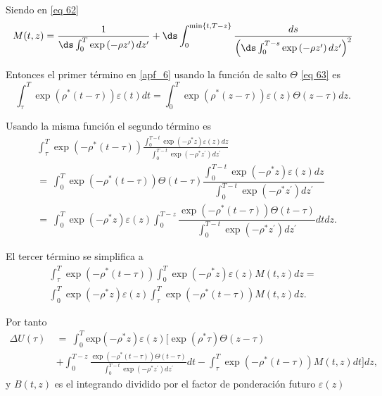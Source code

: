 Siendo en \ref{eq 62}
\begin{equation}
M(t, z)=\dfrac{1}{\ds \int_0^T \exp \left(-\rho z^{\prime}\right) d z^{\prime}}+\ds \int_0^{\min \{t, T-z\}} \dfrac{d s}{\left(\ds \int_0^{T-s} \exp \left(-\rho z^{\prime}\right) d z^{\prime}\right)^2}
\end{equation}

Entonces el primer término en \ref{apf_6} usando la función de salto $\Theta$ \ref{eq 63} es
$$\int_{\tau}^{T}\exp(\rho^{\ast}(t-\tau))\varepsilon(t)d t=\int_{0}^{T}\exp(\rho^{\ast}(z-\tau))\varepsilon(z)\Theta(z-\tau)dz.$$

Usando la misma función el segundo término es
\begin{equation*}
    \begin{split}
        &\int_{\tau}^{T}\exp(-\rho^{\ast}(t-\tau)){\frac{\int_{0}^{T-t}\exp(-\rho^{\ast}z)\varepsilon(z)d z}{\int_{0}^{T-t}\exp(-\rho^{\ast}z^{\prime})d z^{\prime}}}\\
        &=~\int_{0}^{T}\exp(-\rho^{\ast}(t-\tau))\Theta(t-\tau){\dfrac{\int_{0}^{T-t}\exp(-\rho^{\ast}z)\varepsilon(z) dz}{\int_{0}^{T-t}\exp(-\rho^{\ast}z^{\prime})d z^{\prime}}} \\
        &=~\int_{0}^{T}\exp(-\rho^{\ast}z)\varepsilon(z)\int_0^{T-z}{\dfrac{\exp(-\rho^{\ast}(t- \tau))\Theta(t- \tau)}{\int_{0}^{T-t}\exp(-\rho^{\ast}z^{\prime})d z^{\prime}}}dt dz.
    \end{split}
\end{equation*}

El tercer término se simplifica a 
\begin{equation*}
    \begin{split}
        \int_{\tau}^{T}\exp(-\rho^{\ast}(t-\tau))\int_{0}^{T}\exp(-\rho^{\ast}z)\varepsilon(z)M(t,z)dz=\\
        \int_{0}^{T}\exp(-\rho^{\ast}z)\varepsilon(z)\int_{\tau}^{T}\exp(-\rho^{\ast}(t-\tau))M(t,z)d z.
    \end{split}
\end{equation*}

Por tanto
\begin{equation*}
    \begin{split}
        \Delta U(\tau)~&=~\int_{0}^{T}\mathrm{exp}(-\rho^{\ast}z)\varepsilon(z)\biggl[\exp(\rho^{\ast}\tau)\Theta(z-\tau) \\
        &+\int_{0}^{T-z}\frac{\exp(-\rho^{\ast}(t-\tau))\Theta(t-\tau)}{\int_{0}^{T-t}\exp(-\rho^{\ast}z^{\prime})d z^{\prime}}d t-\int_{\tau}^{T}\exp(-\rho^{\ast}(t-\tau))M(t,z)d t\biggl]d z,
    \end{split}
\end{equation*}
y $B(t,z)$ es el integrando dividido por el factor de ponderación futuro $\varepsilon(z)$